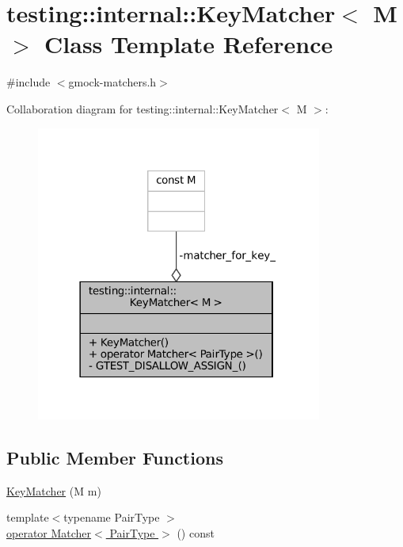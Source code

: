 \hypertarget{classtesting_1_1internal_1_1KeyMatcher}{}\section{testing\+:\+:internal\+:\+:Key\+Matcher$<$ M $>$ Class Template Reference}
\label{classtesting_1_1internal_1_1KeyMatcher}


{\ttfamily \#include $<$gmock-\/matchers.\+h$>$}



Collaboration diagram for testing\+:\+:internal\+:\+:Key\+Matcher$<$ M $>$\+:
\nopagebreak
\begin{figure}[H]
\begin{center}
\leavevmode
\includegraphics[width=266pt]{classtesting_1_1internal_1_1KeyMatcher__coll__graph}
\end{center}
\end{figure}
\subsection*{Public Member Functions}
\begin{DoxyCompactItemize}
\item 
\hyperlink{classtesting_1_1internal_1_1KeyMatcher_a08429692150bf9304b493192abcf16d4}{Key\+Matcher} (M m)
\item 
{\footnotesize template$<$typename Pair\+Type $>$ }\\\hyperlink{classtesting_1_1internal_1_1KeyMatcher_aa3861b06dd9e3255a7c1c013ddf88fb5}{operator Matcher$<$ Pair\+Type $>$} () const
\end{DoxyCompactItemize}

